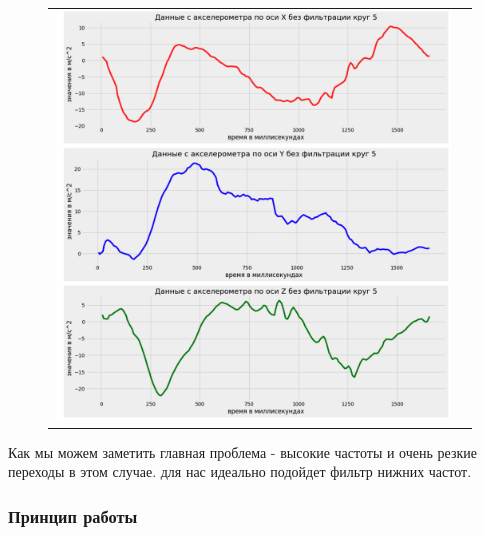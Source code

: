 \begin{figure}[H]
    \begin{center}
        \begin{tabular}{cc}
            \includegraphics[width=1\textwidth]{farim/im7.png} & 
        \end{tabular}
    \end{center}
\end{figure}
Как мы можем заметить главная проблема - высокие частоты и очень резкие переходы в этом случае.
для нас идеально подойдет фильтр нижних частот.






\newpage
\subsubsection{Принцип работы}

